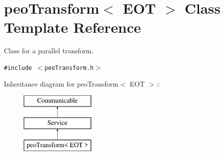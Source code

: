 \hypertarget{classpeoTransform}{
\section{peo\-Transform$<$ EOT $>$ Class Template Reference}
\label{classpeoTransform}
}
Class for a parallel transform.  


{\tt \#include $<$peo\-Transform.h$>$}

Inheritance diagram for peo\-Transform$<$ EOT $>$::\begin{figure}[H]
\begin{center}
\leavevmode
\includegraphics[height=3cm]{classpeoTransform}
\end{center}
\end{figure}
